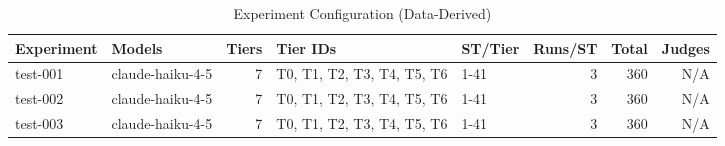 \begin{table}[htbp]
\centering
\caption{Experiment Configuration (Data-Derived)}
\label{tab:experiment_config}
\small
\begin{tabular}{llrllrrr}
\toprule
Experiment & Models & Tiers & Tier IDs & ST/Tier & Runs/ST & Total & Judges \\
\midrule
test-001 & claude-haiku-4-5 & 7 & T0, T1, T2, T3, T4, T5, T6 & 1-41 & 3 & 360 & N/A \\
test-002 & claude-haiku-4-5 & 7 & T0, T1, T2, T3, T4, T5, T6 & 1-41 & 3 & 360 & N/A \\
test-003 & claude-haiku-4-5 & 7 & T0, T1, T2, T3, T4, T5, T6 & 1-41 & 3 & 360 & N/A \\
\bottomrule
\end{tabular}
\end{table}
